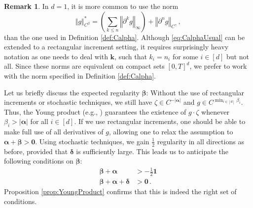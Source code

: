 \documentclass[12pt]{article}
\numberwithin{equation}{section}
\theoremstyle{plain}
\theoremstyle{definition}
\newtheorem{remark}[theorem]{Remark}
\newcommand{\abs}[1]{\left\vert #1 \right\vert}
\newcommand{\norm}[1]{\left\Vert #1\right\Vert}
\def\fk{\mathbf k}\def\fl{\mathbf l}
\def\falpha{{\boldsymbol\alpha}}
\def\fbeta{{\boldsymbol\beta}}
\def\fdelta{{\boldsymbol\delta}}
\def\foo{{\boldsymbol 0}}
\def\fone{{\boldsymbol 1}}
\begin{document}
\begin{remark}
    In $d=1$, it is more common to use the norm
    \begin{equation}\label{eq:CalphaUsual}
        \norm{g}^*_{C^\beta} = \left(\sum_{k\le n}\norm{\partial^k g}_\infty\right) + \norm{\partial^ng}_{C^\gamma}\,,
    \end{equation}
    than the one used in Definition \ref{def:Calpha}. Although \eqref{eq:CalphaUsual} can be extended to a rectangular increment setting, it requires surprisingly heavy notation as one needs to deal with $\fk$, such that $k_i=n_i$ for some $i\in[d]$ but not all. Since these norms are equivalent on compact sets $[0,T]^d$, we prefer to work with the norm specified in Definition \ref{def:Calpha}.
\end{remark}

\noindent Let us briefly discuss the expected regularity $\fbeta$: Without the use of rectangular increments or stochastic techniques, we still have $\zeta\in C^{-\abs{\falpha}}$ and $g\in C^{\min_{i\in[d]} \beta_i}$. Thus, the Young product (e.g., \cite[Section 14]{zambotti2020}) guarantees the existence of $g\cdot\zeta$ whenever $\beta_i>\abs{\falpha}$ for all $i\in[d]$. If we use rectangular increments, one should be able to make full use of all derivatives of $g$, allowing one to relax the assumption to $\falpha+\fbeta > \foo$. Using stochastic techniques, we gain $\frac 12$ regularity in all directions as before, provided that $\fdelta$ is sufficiently large. This leads us to anticipate the following conditions on $\fbeta$:
\begin{align*}
\fbeta+\falpha &> -\frac 12\fone\\   
\fbeta+\falpha+\fdelta&>\foo\,.
\end{align*}
Proposition \ref{prop:YoungProduct} confirms that this is indeed the right set of conditions.
\end{document}
